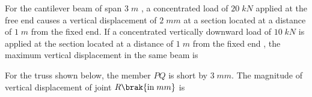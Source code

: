\item For the cantilever beam of span $3\;m$ , a concentrated load of $20\;kN$ applied at the free end causes a vertical displacement of $2\;mm$ at a section located at a distance of $1\;m$ from the fixed end. If a concentrated vertically downward load of $10\; kN$ is applied at the section located at a distance of $1\;m$ from the fixed end , the maximum vertical displacement in the same beam  is \underline{\hspace{2cm}}
	
\item For the truss shown below, the member $PQ$ is short by $3\;mm$. The magnitude of vertical displacement of joint $R\brak{\text{in} \;mm}$ is \underline{\hspace{2cm}}\\
	


